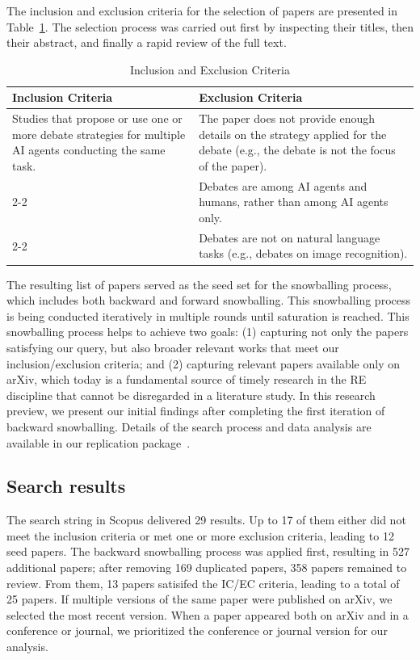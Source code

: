 \documentclass[conference]{IEEEtran}
\begin{document}
The inclusion and exclusion criteria for the selection of papers are presented in Table~\ref{tab:criteria}. %
The selection process was carried out first by inspecting their titles, then their abstract, and finally a rapid review of the full text.

\begin{table}[h]
    \centering
    \renewcommand{\arraystretch}{1.2}
    \setlength{\tabcolsep}{3pt} %
    \caption{Inclusion and Exclusion Criteria}
    \label{tab:criteria}
\begin{tabular}{@{}p{4cm}p{4cm}@{}}
\toprule
\textbf{Inclusion Criteria} & \textbf{Exclusion Criteria} \\
\midrule
Studies that propose or use one or more debate strategies for multiple AI agents conducting the same task. & 
The paper does not provide enough details on the strategy applied for the debate (e.g., the debate is not the focus of the paper). \\
\cmidrule(l){2-2}
& Debates are among AI agents and humans, rather than among AI agents only. \\
\cmidrule(l){2-2}
& Debates are not on natural language tasks (e.g., debates on image recognition). \\
\bottomrule
\end{tabular}
\end{table}

The resulting list of papers served as the seed set for the snowballing process, which includes both backward and forward snowballing. This snowballing process is being conducted iteratively in multiple rounds until saturation is reached. This snowballing process helps to achieve two goals: (1) capturing not only the papers satisfying our query, but also broader relevant works that meet our inclusion/exclusion criteria; and (2) capturing relevant papers available only on arXiv, which today is a fundamental source of timely research in the RE discipline that cannot be disregarded in a literature study. In this research preview, we present our initial findings after completing the first iteration of backward snowballing. Details of the search process and data analysis are available in our replication package~\cite{Oriol2025}.

\subsection{Search results}
The search string in Scopus delivered 29 results. Up to 17 of them either did not meet the inclusion criteria or met one or more exclusion criteria, leading to 12 seed papers. The backward snowballing process was applied first, resulting in 527 additional papers; after removing 169 duplicated papers, 358 papers remained to review. From them, 13 papers satisifed the IC/EC criteria, leading to a total of 25 papers. If multiple versions of the same paper were published on arXiv, we selected the most recent version. When a paper appeared both on arXiv and in a conference or journal, we prioritized the conference or journal version for our analysis.
\end{document}
